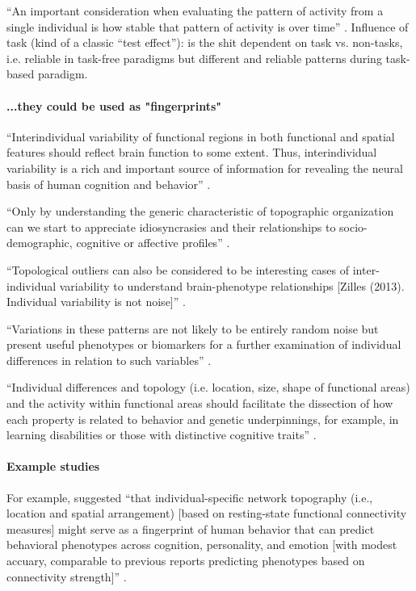 %
``An important consideration when evaluating the pattern of activity from a
single individual is how stable that pattern of activity is over time''
\citep{vanhorn2008individual}.
%
Influence of task (kind of a classic ``test effect''): is the shit dependent on
task vs. non-tasks, i.e. reliable in task-free paradigms but different and
reliable patterns during task-based paradigm.


\paragraph{...they could be used as "fingerprints"}

``Interindividual variability of functional regions in both functional and
spatial features should reflect brain function to some extent.
%
Thus, interindividual variability is a rich and important source of information
for revealing the neural basis of human cognition and behavior''
\citep{zhen2015quantifying}.

%
``Only by understanding the generic characteristic of topographic organization
can we start to appreciate idiosyncrasies and their relationships to
socio-demographic, cognitive or affective profiles''
\citep{eickhoff2018imaging}.

%
``Topological outliers can also be considered to be interesting cases of
inter-individual variability to understand brain-phenotype relationships [Zilles
(2013). Individual variability is not noise]'' \citep{eickhoff2018imaging}.

%
``Variations in these patterns are not likely to be entirely random noise but
present useful phenotypes or biomarkers for a further examination of individual
differences in relation to such variables'' \citep{vanhorn2008individual}.

``Individual differences and topology (i.e. location, size, shape of functional
areas) and the activity within functional areas should facilitate the dissection
of how each property is related to behavior and genetic underpinnings, for
example, in learning disabilities or those with distinctive cognitive traits''
\citep{glasser2016multi}.


\paragraph{Example studies}

%
For example, \citet{kong2019spatial} suggested ``that individual-specific network
topography (i.e., location and spatial arrangement) [based on resting-state
functional connectivity measures] might serve as a fingerprint of human
behavior that can predict behavioral phenotypes across cognition, personality,
and emotion [with modest accuary, comparable to previous reports predicting
phenotypes based on connectivity strength]'' \citep{kong2019spatial}.

